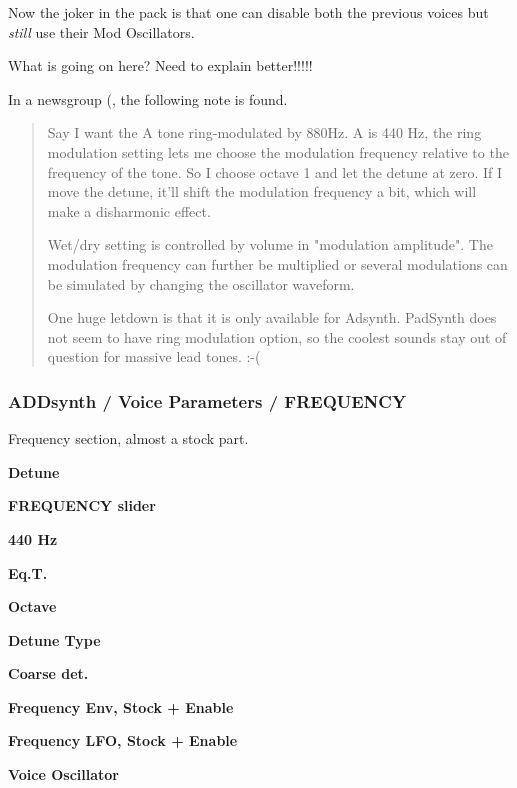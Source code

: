    Now the joker in the pack is that one can disable both the previous
   voices but \textsl{still} use their Mod Oscillators.

   What is going on here?  Need to explain better!!!!!

   In a newsgroup (\cite{ringmodulator}, the following note is found.

   \begin{quotation}
      Say I want the A tone ring-modulated by 880Hz. A is 440 Hz, the ring
      modulation setting lets me choose the modulation frequency relative
      to the frequency of the tone. So I choose octave 1 and let the
      detune at zero. If I move the detune, it'll shift the modulation
      frequency a bit, which will make a disharmonic effect.

      Wet/dry setting is controlled by volume in "modulation amplitude".
      The modulation frequency can further be multiplied or several
      modulations can be simulated by changing the oscillator waveform.

      One huge letdown is that it is only available for Adsynth. PadSynth
      does not seem to have ring modulation option, so the coolest sounds
      stay out of question for massive lead tones. :-(
   \end{quotation}

\subsubsection{ADDsynth / Voice Parameters / FREQUENCY}
\label{subsubsec:addsynth_voice_parameters_frequency}


   Frequency section, almost a stock part.

   \begin{enumber}
      \item \textbf{Detune}
      \item \textbf{FREQUENCY slider}
      \item \textbf{440 Hz}         %
      \item \textbf{Eq.T.}          %
      \item \textbf{Octave}
      \item \textbf{Detune Type}
      \item \textbf{Coarse det.}
      \item \textbf{Frequency Env, Stock + Enable}
      \item \textbf{Frequency LFO, Stock + Enable}
      \item \textbf{Voice Oscillator}
   \end{enumber}


